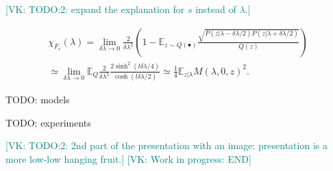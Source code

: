 \documentclass[
  american,aps,pra,reprint,floatfix,nofootinbib,superscriptaddress
]{revtex4-2}
\newcommand{\VK}[1]{\textcolor{teal}{[VK: #1]}}
\begin{document}
\VK{TODO:2: expand the explanation for $s$ instead of $\lambda$.}

    \begin{multline*}
      \chi_{F_c}(\lambda) = \lim_{\delta \lambda\to 0} \frac2{\delta \lambda^2} \left(1 - \mathbb{E}_{z\sim Q(\bullet)} \frac{\sqrt{P(z|\lambda-\delta \lambda/2)P(z|\lambda+\delta \lambda/2)}}{Q(z)}\right)
      \\ \simeq \lim_{\delta \lambda\to 0} \mathbb{E}_{Q}\frac2{\delta \lambda^2}\frac{2\sinh^2(l\delta \lambda/4)}{\cosh(l\delta \lambda/2)} \simeq \frac14 \mathbb{E}_{z|\lambda} M(\lambda, 0, z)^2.
    \end{multline*}

TODO: models

TODO: experiments

\VK{TODO:2: 2nd part of the presentation with an image: presentation is a more low-low hanging fruit.}
\VK{Work in progress: END}



\end{document}
